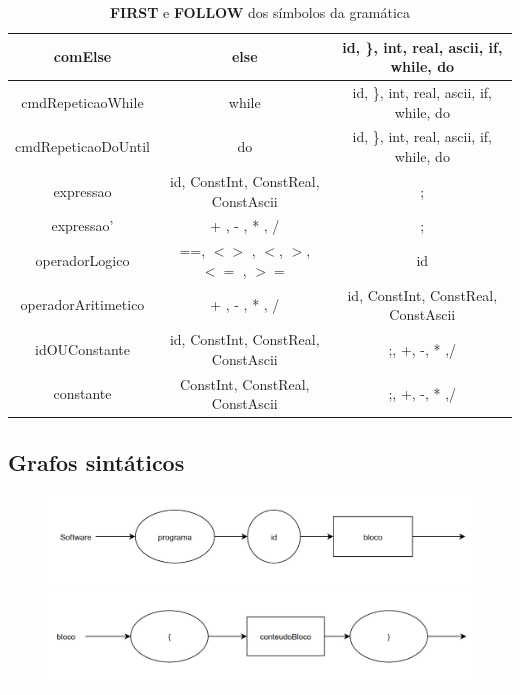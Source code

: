 \documentclass[11pt]{article}
\begin{document}
\begin{table}[H]
\begin{tabular}{c|c|c}
        \hline
        comElse              & else                                & id, \}, int, real, ascii, if, while, do \\
        \hline
        cmdRepeticaoWhile    & while                               & id, \}, int, real, ascii, if, while, do \\
        \hline
        cmdRepeticaoDoUntil  & do                                  & id, \}, int, real, ascii, if, while, do \\
        \hline
        expressao            & id, ConstInt, ConstReal, ConstAscii & ; \\
        \hline
        expressao'           & + , - , * , /                       & ; \\
        \hline
        operadorLogico       & ==, $<>$ , $<$, $>$, $<=$ , $>=$    & id  \\
        \hline
        operadorAritimetico  &  + , - , * , /                      & id, ConstInt, ConstReal, ConstAscii \\
        \hline
        idOUConstante        & id, ConstInt, ConstReal, ConstAscii &  ;, +, -, * ,/ \\
        \hline
        constante            & ConstInt, ConstReal, ConstAscii     &  ;, +, -, * ,/   \\
        \hline
    \end{tabular}
    \caption{\textbf{FIRST} e \textbf{FOLLOW} dos símbolos da gramática}
\end{table}


\subsection*{Grafos sintáticos}

\begin{figure}[H]
   \includegraphics[]{grafos_sintaticos/software.png}
   \includegraphics[]{grafos_sintaticos/bloco.png}
\end{figure}
\end{document}
